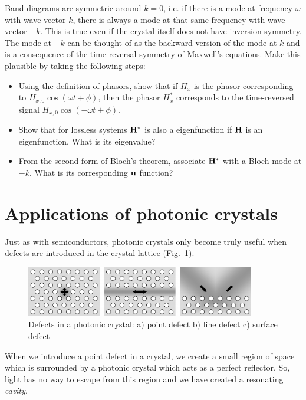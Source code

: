 \begin{sidebar}
\begin{ex}
Band diagrams are symmetric around $k=0$, i.e. if there is a mode at frequency $\omega$ with wave vector $k$, there is always a mode at that same frequency with wave vector $-k$. This is true even if the crystal itself does not have inversion symmetry. The mode at $-k$ can be thought of as the backward version of the mode at $k$ and is a consequence of the time reversal symmetry of Maxwell's equations. Make this plausible by taking the following steps:
\begin{itemize}
\item Using the definition of phasors, show that if $H_x$ is the phasor corresponding to $ H_{x,0} \cos \left( \omega t + \phi \right)$, then the phasor $H^*_x$ corresponds to the time-reversed signal $ H_{x,0} \cos \left(- \omega t + \phi  \right)$.
\item Show that for lossless systems ${\bf H}^*$ is also a eigenfunction if ${\bf H}$ is an eigenfunction. What is its eigenvalue?
\item From the second form of Bloch's theorem, associate ${\bf H}^*$ with a Bloch mode at $-k$. What is its corresponding ${\bf u}$ function?
\end{itemize}

\end{ex}
\end{sidebar}

\section{Applications of photonic crystals}

Just as with semiconductors, photonic crystals only become truly useful when defects are introduced in the crystal lattice (Fig.~\ref{fig-defects}).

\begin{figure}
\centering
\includegraphics[width=10cm]{periodic/figures/2d_defects}
\caption{Defects in a photonic crystal: a) point defect b) line defect c) surface defect }
\label{fig-defects}
\end{figure}

When we introduce a point defect in a crystal, we create a small region of space which is surrounded by a photonic crystal which acts as a perfect reflector. So, light has no way to escape from this region and we have created a resonating \emph{cavity}.

